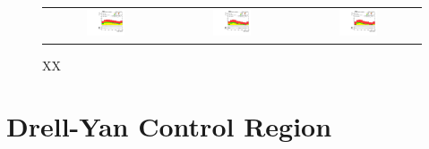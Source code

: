  \begin{figure}[tbh!]
 \begin{center}
 \begin{tabular}{ccc}
 \includegraphics[width=0.33\textwidth]{figures/Part4/Evt/LFVemuM}&
  \includegraphics[width=0.33\textwidth]{figures/Part4/Evt/LFVetaM}&
   \includegraphics[width=0.33\textwidth]{figures/Part4/Evt/LFVmutaM}\\
 \end{tabular}
 \caption{XX}
 \label{fig:Summary}
 \end{center}
 \end{figure}

\section{Drell-Yan Control Region}
\label{sec:DY_CR}

